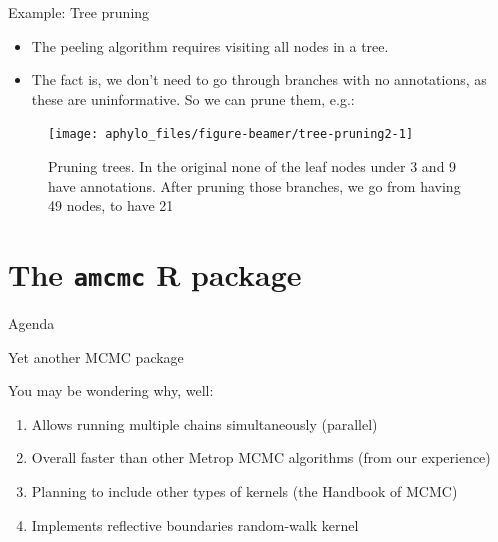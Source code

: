 \documentclass[9pt,handout,ignorenonframetext,]{beamer}
\begin{document}
\begin{frame}[t]{Example: Tree pruning}

\begin{itemize}
\item
  The peeling algorithm requires visiting all nodes in a tree.\pause
\item
  The fact is, we don't need to go through branches with no annotations,
  as these are uninformative. \pause So we can prune them, e.g.:\pause
\end{itemize}

\footnotesize

\normalsize

\footnotesize

\begin{figure}

{\centering \texttt{[image: aphylo\_files/figure-beamer/tree-pruning2-1]} 

}

\caption{Pruning trees. In the original none of the leaf nodes under 3 and 9 have annotations. After pruning those branches, we go from having 49  nodes, to have 21}\label{fig:tree-pruning2}
\end{figure}

\normalsize

\end{frame}

\section{\texorpdfstring{The \texttt{amcmc} R
package}{The amcmc R package}}\label{the-amcmc-r-package}

\begin{frame}[t]{Agenda}

\tableofcontents[currentsection]

\end{frame}

\begin{frame}{Yet another MCMC package}

You may be wondering why, well:

\begin{enumerate}
\def\labelenumi{\arabic{enumi}.}
\item
  Allows running multiple chains simultaneously (parallel)
\item
  Overall faster than other Metrop MCMC algorithms (from our experience)
\item
  Planning to include other types of kernels (the Handbook of MCMC)
\item
  Implements reflective boundaries random-walk kernel
\end{enumerate}

\end{frame}
\end{document}
